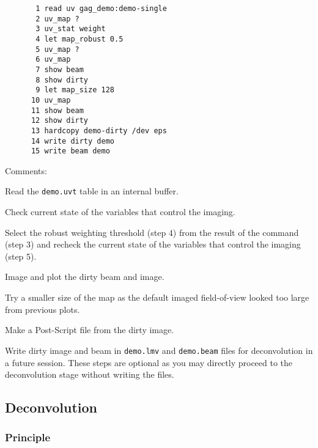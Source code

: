 \begin{verbatim}
       1 read uv gag_demo:demo-single
       2 uv_map ?
       3 uv_stat weight
       4 let map_robust 0.5
       5 uv_map ?
       6 uv_map
       7 show beam
       8 show dirty
       9 let map_size 128
      10 uv_map
      11 show beam
      12 show dirty
      13 hardcopy demo-dirty /dev eps
      14 write dirty demo
      15 write beam demo
\end{verbatim}
Comments:
\begin{description}\itemsep 0pt
  \item[Step 1] Read the \texttt{demo.uvt} \uv{} table in an internal buffer.
  \item[Step 2] Check current state of the variables that control the 
  imaging.
  \item[Steps 3-5] Select the robust weighting threshold (step 4) from 
  the result of the  command (step 3) and recheck the 
  current state of the variables that control the imaging (step 5).
  \item[Steps 6-8] Image and plot the dirty beam and image.
  \item[Steps 9-12] Try a smaller size of the map as the default imaged 
  field-of-view looked too large from previous plots.
  \item[Steps 13] Make a Post-Script file from the dirty image.
  \item[Steps 14-15] Write dirty image and beam in \texttt{demo.lmv} 
  and \texttt{demo.beam} files for deconvolution in a future \imager{} 
  session. These steps are optional as you may directly proceed to the 
  deconvolution stage without writing the files.
\end{description}

\subsection{Deconvolution}

\subsubsection{Principle}

